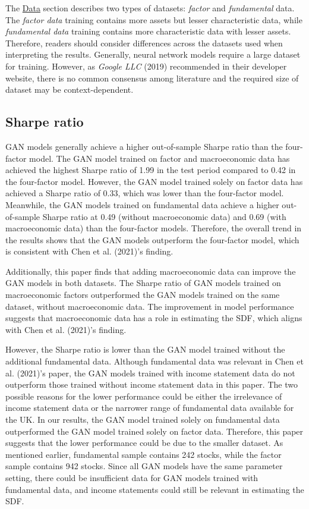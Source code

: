 \documentclass[12pt]{article}
\begin{document}
\thispagestyle{plain}

The \protect\hyperlink{data}{Data} section describes two types of
datasets: \emph{factor} and \emph{fundamental} data.
The \emph{factor data} training contains more assets but lesser
characteristic data, while \emph{fundamental data} training
contains more characteristic data with lesser assets.
Therefore, readers should consider differences across the
datasets used when interpreting the results.
Generally, neural network models require a large dataset for
training. However, as \emph{Google {LLC}} (2019) recommended in their
developer website, there is no common consensus among
literature and the required size of dataset may be
context-dependent.

\hypertarget{sharpe-ratio}{%
\subsection{Sharpe ratio}\label{sharpe-ratio}}

GAN models generally achieve a higher out-of-sample Sharpe
ratio than the four-factor model. The GAN model trained on
factor and macroeconomic data has achieved the highest Sharpe
ratio of 1.99 in the test period compared to 0.42 in
the four-factor model.
However, the GAN model trained solely on factor data has achieved a
Sharpe ratio of 0.33, which was lower than the four-factor model.
Meanwhile, the GAN models trained on fundamental data achieve a higher
out-of-sample Sharpe ratio at 0.49 (without macroeconomic
data) and 0.69 (with macroeconomic data) than the
four-factor models.
Therefore, the overall trend in the results shows that the GAN models
outperform the four-factor model, which is consistent with
Chen et al. (2021)'s finding.

Additionally, this paper finds that adding macroeconomic data
can improve the GAN models in both datasets. The Sharpe ratio of
GAN models trained on macroeconomic factors outperformed the
GAN models trained on the same dataset, without
macroeconomic data. The improvement in
model performance suggests that macroeconomic data
has a role in estimating the SDF, which aligns with
Chen et al. (2021)'s finding.

However, the Sharpe ratio is lower than the GAN model
trained without the additional fundamental data.
Although fundamental data was relevant in Chen et al. (2021)'s
paper, the GAN models trained with income
statement data do not outperform those trained without
income statement data in this paper.
The two possible reasons for the lower performance could be
either the irrelevance of income statement data or the
narrower range of fundamental data available for the UK.
In our results, the GAN model trained solely on fundamental data
outperformed the GAN model trained solely on factor
data. Therefore, this paper suggests that the lower
performance could be due to the smaller dataset.
As mentioned earlier, fundamental sample contains 242 stocks, while the factor
sample contains 942 stocks. Since all GAN models have the
same parameter setting, there could be insufficient data for
GAN models trained with fundamental data, and income
statements could still be relevant in estimating the SDF.
\end{document}
